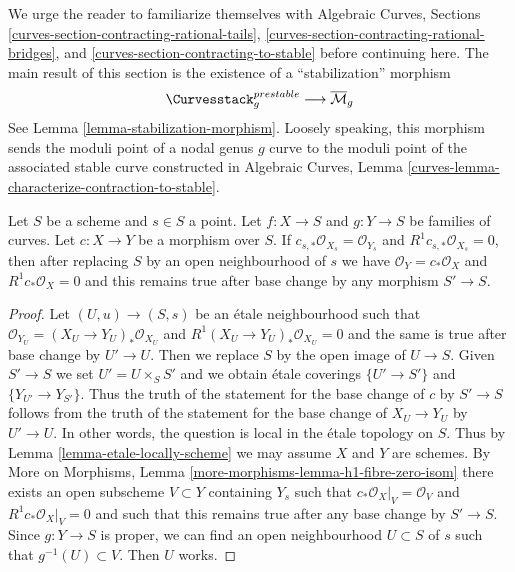 \noindent
We urge the reader to familiarize themselves with
Algebraic Curves, Sections
\ref{curves-section-contracting-rational-tails},
\ref{curves-section-contracting-rational-bridges}, and
\ref{curves-section-contracting-to-stable}
before continuing here. The main result of this section
is the existence of a ``stabilization'' morphism
$$
\Curvesstack^{prestable}_g
\longrightarrow
\overline{\mathcal{M}}_g
$$
See Lemma \ref{lemma-stabilization-morphism}.
Loosely speaking, this morphism sends the moduli point of
a nodal genus $g$ curve to the moduli point of the associated stable
curve constructed in
Algebraic Curves, Lemma \ref{curves-lemma-characterize-contraction-to-stable}.

\begin{lemma}
\label{lemma-contract}
Let $S$ be a scheme and $s \in S$ a point.
Let $f : X \to S$ and $g : Y \to S$ be families of curves.
Let $c : X \to Y$ be a morphism over $S$. If
$c_{s, *}\mathcal{O}_{X_s} = \mathcal{O}_{Y_s}$ and
$R^1c_{s, *}\mathcal{O}_{X_s} = 0$, then
after replacing $S$ by an open neighbourhood of $s$
we have $\mathcal{O}_Y = c_*\mathcal{O}_X$ and $R^1c_*\mathcal{O}_X = 0$
and this remains true after base change by any morphism $S' \to S$.
\end{lemma}

\begin{proof}
Let $(U, u) \to (S, s)$ be an \'etale neighbourhood such that
$\mathcal{O}_{Y_U} = (X_U \to Y_U)_*\mathcal{O}_{X_U}$ and
$R^1(X_U \to Y_U)_*\mathcal{O}_{X_U} = 0$ and the same is true
after base change by $U' \to U$. Then we replace $S$ by the
open image of $U \to S$. Given $S' \to S$ we set $U' = U \times_S S'$
and we obtain \'etale coverings $\{U' \to S'\}$ and
$\{Y_{U'} \to Y_{S'}\}$. Thus the truth of the statement for
the base change of $c$ by $S' \to S$ follows from the truth
of the statement for the base change of $X_U \to Y_U$ by
$U' \to U$. In other words, the question is local in the
\'etale topology on $S$.
Thus by Lemma \ref{lemma-etale-locally-scheme} we may assume
$X$ and $Y$ are schemes. By
More on Morphisms, Lemma \ref{more-morphisms-lemma-h1-fibre-zero-isom}
there exists an open subscheme $V \subset Y$ containing $Y_s$
such that $c_*\mathcal{O}_X|_V = \mathcal{O}_V$ and
$R^1c_*\mathcal{O}_X|_V = 0$ and such that this remains true after
any base change by $S' \to S$. Since $g : Y \to S$ is proper, we can
find an open neighbourhood $U \subset S$ of $s$ such that
$g^{-1}(U) \subset V$. Then $U$ works.
\end{proof}


